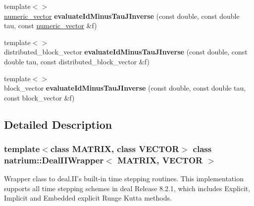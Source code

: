 \begin{DoxyCompactItemize}
\item 
\hypertarget{classnatrium_1_1DealIIWrapper_a9a50370a5fbdce709aab87a4c38d5247}{
{\footnotesize template$<$$>$ }\\\hyperlink{namespacenatrium_a67c39077adc6634f8fa3762b8eef24c4}{numeric\_\-vector} {\bfseries evaluateIdMinusTauJInverse} (const double, const double tau, const \hyperlink{namespacenatrium_a67c39077adc6634f8fa3762b8eef24c4}{numeric\_\-vector} \&f)}
\label{classnatrium_1_1DealIIWrapper_a9a50370a5fbdce709aab87a4c38d5247}

\item 
\hypertarget{classnatrium_1_1DealIIWrapper_aea3a4ef30de64fa1c771ff8df4a7c358}{
{\footnotesize template$<$$>$ }\\distributed\_\-block\_\-vector {\bfseries evaluateIdMinusTauJInverse} (const double, const double tau, const distributed\_\-block\_\-vector \&f)}
\label{classnatrium_1_1DealIIWrapper_aea3a4ef30de64fa1c771ff8df4a7c358}

\item 
\hypertarget{classnatrium_1_1DealIIWrapper_a4446840f5a8e7eaad5f96d416b7f4f66}{
{\footnotesize template$<$$>$ }\\block\_\-vector {\bfseries evaluateIdMinusTauJInverse} (const double, const double tau, const block\_\-vector \&f)}
\label{classnatrium_1_1DealIIWrapper_a4446840f5a8e7eaad5f96d416b7f4f66}

\end{DoxyCompactItemize}


\subsection{Detailed Description}
\subsubsection*{template$<$class MATRIX, class VECTOR$>$ class natrium::DealIIWrapper$<$ MATRIX, VECTOR $>$}

Wrapper class to deal.II's built-\/in time stepping routines. This implementation supports all time stepping schemes in deal Release 8.2.1, which includes Explicit, Implicit and Embedded explicit Runge Kutta methods. 

